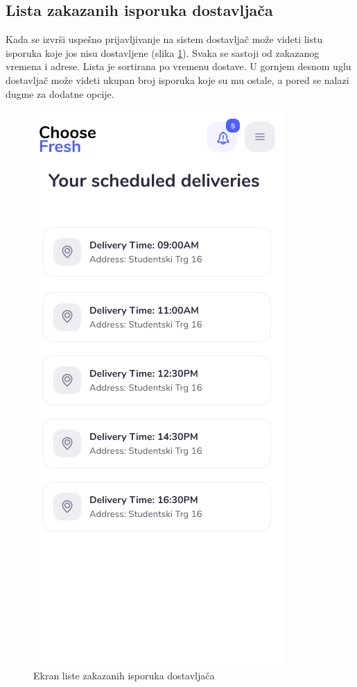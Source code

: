 \subsection{Lista zakazanih isporuka dostavljača}

Kada se izvrši uspešno prijavljivanje na sistem dostavljač može videti listu isporuka koje jos nisu dostavljene (slika \ref{fig:DeliverymanList}). Svaka se sastoji od zakazanog vremena i adrese. Lista je sortirana po vremenu dostave. U gornjem desnom uglu dostavljač može videti ukupan broj isporuka koje su mu ostale, a pored se nalazi dugme za dodatne opcije. 


\begin{figure}[H]
	\begin{center}
		\includegraphics[scale=0.3]{UI/deliveryman_list_of_packages.png}
    		\caption{Ekran liste zakazanih isporuka dostavljača}
    \label{fig:DeliverymanList}
    \end{center}
\end{figure}